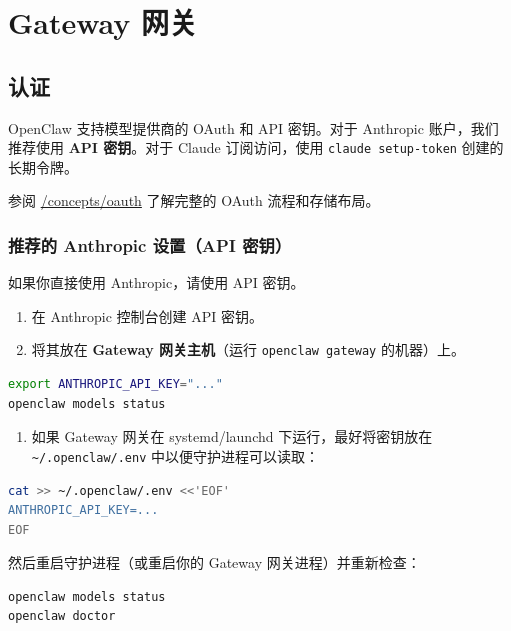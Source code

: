 \chapter{Gateway 网关}

\section{认证}


OpenClaw 支持模型提供商的 OAuth 和 API 密钥。对于 Anthropic 账户，我们推荐使用 \textbf{API 密钥}。对于 Claude 订阅访问，使用 \texttt{claude setup-token} 创建的长期令牌。

参阅 \href{/concepts/oauth}{/concepts/oauth} 了解完整的 OAuth 流程和存储布局。

\subsection{推荐的 Anthropic 设置（API 密钥）}


如果你直接使用 Anthropic，请使用 API 密钥。

\begin{enumerate}
  \item 在 Anthropic 控制台创建 API 密钥。
  \item 将其放在 \textbf{Gateway 网关主机}（运行 \texttt{openclaw gateway} 的机器）上。
\end{enumerate}


\begin{lstlisting}[language=bash]
export ANTHROPIC_API_KEY="..."
openclaw models status
\end{lstlisting}


\begin{enumerate}
  \item 如果 Gateway 网关在 systemd/launchd 下运行，最好将密钥放在 \texttt{\textasciitilde{}/.openclaw/.env} 中以便守护进程可以读取：
\end{enumerate}


\begin{lstlisting}[language=bash]
cat >> ~/.openclaw/.env <<'EOF'
ANTHROPIC_API_KEY=...
EOF
\end{lstlisting}


然后重启守护进程（或重启你的 Gateway 网关进程）并重新检查：

\begin{lstlisting}[language=bash]
openclaw models status
openclaw doctor
\end{lstlisting}


